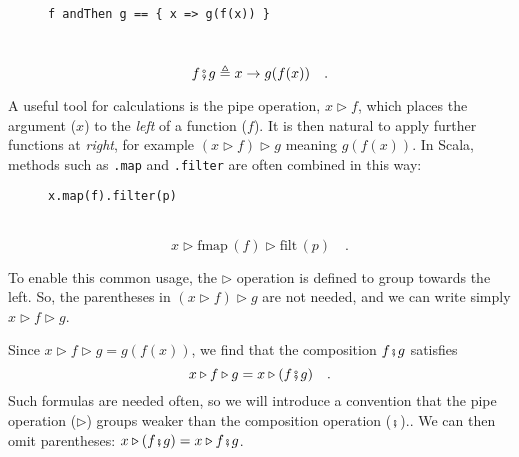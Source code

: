 \begin{wrapfigure}{l}{0.5\columnwidth}%
\vspace{-0.65\baselineskip}
\begin{lstlisting}
f andThen g == { x => g(f(x)) }
\end{lstlisting}

\vspace{-0.25\baselineskip}
\end{wrapfigure}%

~\vspace{-0.35\baselineskip}
\[
f\bef g\triangleq x\rightarrow g(f(x))\quad.
\]
\vspace{-0.85\baselineskip}

A useful tool for calculations is the pipe operation,
$x\triangleright f$, which places the argument ($x$) to the \emph{left}
of a function ($f$). It is then natural to apply further functions
at \emph{right}, for example $(x\triangleright f)\triangleright g$
meaning $g(f(x))$. In Scala, methods such as \lstinline!.map! and
\lstinline!.filter! are often combined in this way:

\begin{wrapfigure}{l}{0.5\columnwidth}%
\vspace{-0.65\baselineskip}
\begin{lstlisting}
x.map(f).filter(p)
\end{lstlisting}

\vspace{-0.25\baselineskip}
\end{wrapfigure}%

~\vspace{-0.35\baselineskip}
\[
x\triangleright\text{fmap}\,(f)\triangleright\text{filt}\,(p)\quad.
\]
\vspace{-0.85\baselineskip}

To enable this common usage, the $\triangleright$ operation is defined
to group towards the left. So, the parentheses in $(x\triangleright f)\triangleright g$
are not needed, and we can write simply $x\triangleright f\triangleright g$. 

Since $x\triangleright f\triangleright g=g(f(x))$, we find that the
composition $f\bef g$ satisfies
\[
x\triangleright f\triangleright g=x\triangleright(f\bef g)\quad.
\]
Such formulas are needed often, so we will introduce a convention
that the pipe operation ($\triangleright$) groups weaker than the
composition operation ($\bef$)..
We can then omit parentheses: $x\triangleright(f\bef g)=x\triangleright f\bef g$. 

